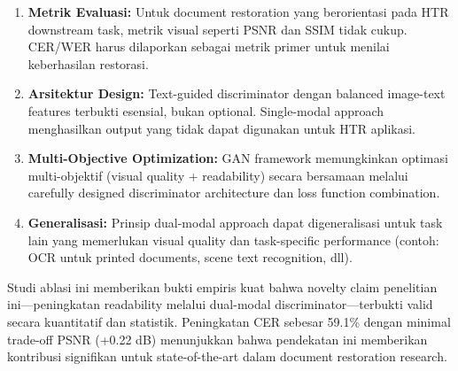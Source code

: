 \begin{enumerate}
    \item \textbf{Metrik Evaluasi:} Untuk document restoration yang berorientasi pada HTR downstream task, metrik visual seperti PSNR dan SSIM tidak cukup. CER/WER harus dilaporkan sebagai metrik primer untuk menilai keberhasilan restorasi.
    
    \item \textbf{Arsitektur Design:} Text-guided discriminator dengan balanced image-text features terbukti esensial, bukan optional. Single-modal approach menghasilkan output yang tidak dapat digunakan untuk HTR aplikasi.
    
    \item \textbf{Multi-Objective Optimization:} GAN framework memungkinkan optimasi multi-objektif (visual quality + readability) secara bersamaan melalui carefully designed discriminator architecture dan loss function combination.
    
    \item \textbf{Generalisasi:} Prinsip dual-modal approach dapat digeneralisasi untuk task lain yang memerlukan visual quality dan task-specific performance (contoh: OCR untuk printed documents, scene text recognition, dll).
\end{enumerate}

Studi ablasi ini memberikan bukti empiris kuat bahwa novelty claim penelitian ini---peningkatan readability melalui dual-modal discriminator---terbukti valid secara kuantitatif dan statistik. Peningkatan CER sebesar 59.1\% dengan minimal trade-off PSNR (+0.22 dB) menunjukkan bahwa pendekatan ini memberikan kontribusi signifikan untuk state-of-the-art dalam document restoration research.
